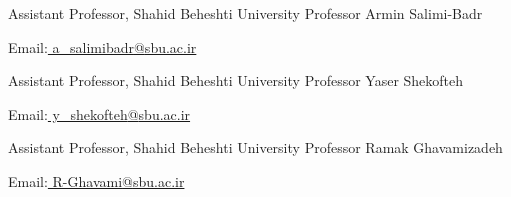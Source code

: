 \begin{cventries}
    \cventry
    {Assistant Professor, Shahid Beheshti University}
    {Professor Armin Salimi-Badr}
    {}
    {}
    {
      \begin{cvitems}
	    \item{Email:\href{mailto:a_salimibadr@sbu.ac.ir}{ a\_salimibadr{@}sbu.ac.ir}}
      \end{cvitems}
    }
    \vspace{0.3 cm}
    \cventry
    {Assistant Professor, Shahid Beheshti University}
    {Professor Yaser Shekofteh}
    {}
    {}
    {
      \begin{cvitems}
	    \item{Email:\href{mailto:y_shekofteh@sbu.ac.ir}{ y\_shekofteh{@}sbu.ac.ir}}
      \end{cvitems}
    }
    \vspace{0.3 cm}
    \cventry
    {Assistant Professor, Shahid Beheshti University}
    {Professor Ramak Ghavamizadeh}
    {}
    {}
    {
      \begin{cvitems}
	    \item{Email:\href{mailto:R-Ghavami@sbu.ac.ir}{ R-Ghavami{@}sbu.ac.ir}}
      \end{cvitems}
    }
\end{cventries}
